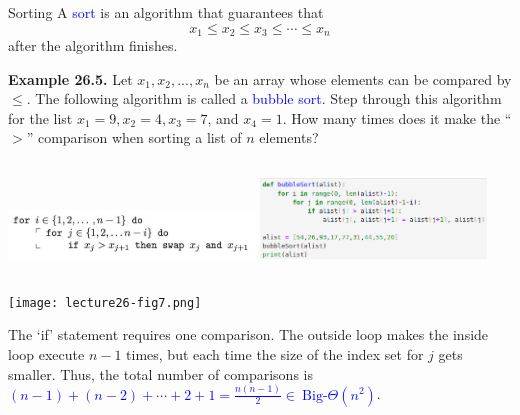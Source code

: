 \documentclass[aspectratio=169]{beamer}
\providecommand{\Blue}[1]{\textcolor{blue}{#1}}
\begin{document}
\begin{frame}[plain]{Sorting}
 A \Blue{sort} is an algorithm that guarantees that
	       \[ x_1\leq  x_2\leq  x_3\leq \cdots \leq x_n \]
	       after the algorithm finishes.\pause 
	       \smallskip
	       
 {\bf Example 26.5.} Let $x_1, x_2, ..., x_n$ be an array whose elements can be compared
		    by $\leq $. The following algorithm is called a \Blue{bubble sort}.
		    Step through this algorithm for the list $x_1=9, x_2=4, x_3=7$, and $x_4=1$.
		How many times does it make the ``$>$'' comparison when sorting a list of $n$ 
		elements?
		\begin{columns}
		\begin{column}{0.5\textwidth}
		\begin{center}
			\includegraphics[height=1.3cm]{./img/lecture26-fig6.png}
			\includegraphics[height=2.2cm]{./img/lecture26-fig6b.png}
		\end{center}
		\vspace{1.5in}
		
		\end{column}
		\begin{column}{0.5\textwidth}		   
		   
		 \end{column}
		 \end{columns}

\end{frame}

\begin{frame}[plain]{}
 
  \begin{center}
   \texttt{[image: lecture26-fig7.png]}
  \end{center}
  The `if' statement requires one comparison. The outside loop makes the inside loop execute $n-1$ times,
  but each time the size of the index set for $j$ gets smaller. Thus, the total number of comparisons is
  \Blue{$(n-1)+(n-2)+\cdots +2+1 = \frac{n(n-1)}{2} \in \ \mbox{Big-}\Theta(n^2)$}.
 
\end{frame}
\end{document}
